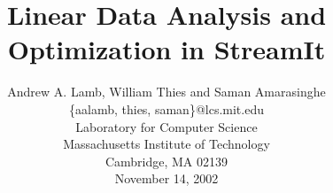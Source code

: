 \documentclass{sig-alternate}
\title{Linear Data Analysis and Optimization in StreamIt}
\author{
\alignauthor \vspace{-18pt}
Andrew A. Lamb,
William Thies
and Saman Amarasinghe\\
	\vspace{8pt}
	\{aalamb, thies, saman\}@lcs.mit.edu \\
	\vspace{8pt}
	Laboratory for Computer Science \\
	Massachusetts Institute of Technology \\
	Cambridge, MA  02139 \\
	\vspace{8pt}
        November 14, 2002}
\begin{document}
\newtheorem{definition}{Definition}
\newtheorem{combination}{Combination}

\maketitle

\newcommand{\mt}[1]{\mbox{\it #1}}

\begin{abstract}

\end{abstract}












\clearpage

\appendix

\end{document}
